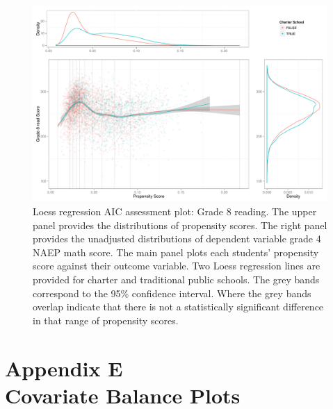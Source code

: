 \begin{figure}[h!]
\begin{center}
\includegraphics{../Figures2009/g8read-loessAIC.pdf}
\caption[Loess regression AIC assessment plot: Grade 8 reading]{Loess regression AIC assessment plot: Grade 8 reading. The upper panel provides the distributions of propensity scores. The right panel provides the unadjusted distributions of dependent variable grade 4 NAEP math score. The main panel plots each students' propensity score against their outcome variable. Two Loess regression lines are provided for charter and traditional public schools. The grey bands correspond to the 95\% confidence interval. Where the grey bands overlap indicate that there is not a statistically significant difference in that range of propensity scores.}
\label{fig:g8read:loess}
\end{center}
\end{figure}


\clearpage
{}
\section*{Appendix E\\Covariate Balance Plots}
\label{appendixE}



